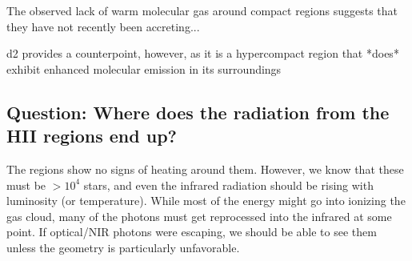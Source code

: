 \documentclass{aa}
\begin{document}
The observed lack of warm molecular gas around compact \hii regions suggests
that they have not recently been accreting...

d2 provides a counterpoint, however, as it is a hypercompact \hii region that *does*
exhibit enhanced molecular emission in its surroundings


\subsection{Question: Where does the radiation from the HII regions end up?}
The \hii regions show no signs of heating around them.  However, we know that
these must be $>10^4$ \lsun stars, and even the infrared radiation should be
rising with luminosity (or temperature).  While most of the energy might go
into ionizing the gas cloud, many of the photons must get reprocessed into the
infrared at some point.  If optical/NIR photons were escaping, we should be
able to see them unless the geometry is particularly unfavorable.


\end{document}

